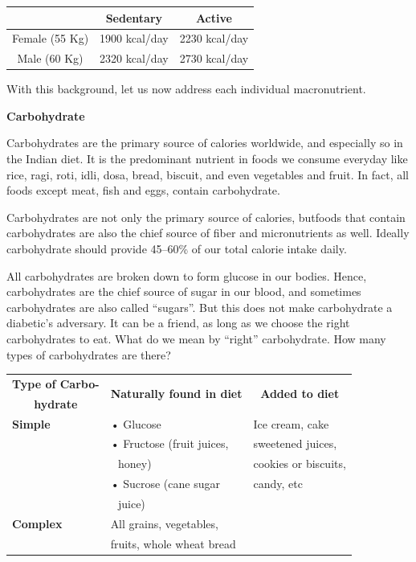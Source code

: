 \begin{center}
\begin{tabular}{|c|c|c|}
\hline
 & \textbf{Sedentary} & \textbf{Active}\\
\hline
Female (55 Kg) & 1900 kcal/day & 2230 kcal/day\\
\hline
Male (60 Kg) & 2320 kcal/day & 2730 kcal/day\\
\hline
\end{tabular}
\end{center}

With this background, let us now address each individual macro\-nutrient.

\noindent\textbf{Carbohydrate}

Carbohydrates are the primary source of calories worldwide, and especially so in the Indian diet. It is the predominant nutrient in foods we consume everyday like rice, ragi, roti, idli, dosa, bread, biscuit, and even vegetables and fruit. In fact, all foods except meat, fish and eggs, contain carbohydrate.

Carbohydrates are not only the primary source of calories, but\break foods that contain carbohydrates are also the chief source of fiber and micronutrients as well. Ideally carbohydrate should provide 45–60\% of our total calorie intake daily.

All carbohydrates are broken down to form glucose in our bodies. Hence, carbohydrates are the chief source of sugar in our blood, and sometimes carbohydrates are also called “sugars”. But this does not make carbohydrate a diabetic’s adversary. It can be a friend, as long as we choose the right carbohydrates to eat. What do we mean by “right” carbohydrate. How many types of carbohydrates are there?

\begin{center}
\begin{tabular}{|l|l|l|}
\hline
\multicolumn{1}{|c}{\textbf{Type of Carbo-}} & \multicolumn{1}{|c}{\multirow{2}{4cm}{\textbf{Naturally found in diet}}} & \multicolumn{1}{|c|}{\multirow{2}{2.3cm}{\textbf{Added to diet}}}\\
\multicolumn{1}{|c|}{\textbf{hydrate}} & &\\
\hline
\textbf{Simple} & • Glucose & Ice cream, cake\\
\hline
 & • Fructose (fruit juices, & sweetened juices,\\
  & \,\, honey) & cookies or biscuits,\\
  & • Sucrose (cane sugar & candy, etc\\
  & \,\, juice) & \\
\hline
\textbf{Complex} & All grains, vegetables, &\\
 & fruits, whole wheat bread &\\
\hline
\end{tabular}
\end{center}

